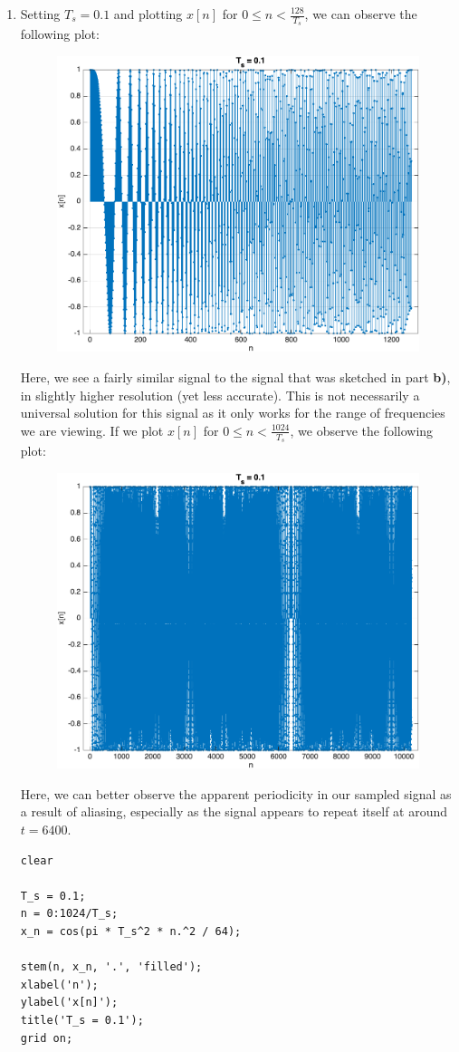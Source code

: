 \documentclass[12pt]{article}
\begin{document}
\begin{enumerate}[label=\textbf{\alph*)}, leftmargin=2.6em]
\item Setting $T_s=0.1$ and plotting $x[n]$ for $0\le n<\frac{128}{T_s}$, we can observe the following plot:
\begin{figure} [H]
    \centering
    \includegraphics[width=0.5\linewidth]{2d.png}
\end{figure}
Here, we see a fairly similar signal to the signal that was sketched in part \textbf{b)}, in slightly higher resolution (yet less accurate). This is not necessarily a universal solution for this signal as it only works for the range of frequencies we are viewing. If we plot $x[n]$ for $0\le n<\frac{1024}{T_s}$, we observe the following plot:
\begin{figure} [H]
    \centering
    \includegraphics[width=0.5\linewidth]{2e.png}
\end{figure}
Here, we can better observe the apparent periodicity in our sampled signal as a result of aliasing, especially as the signal appears to repeat itself at around $t=6400$.

\begin{verbatim}
clear

T_s = 0.1;
n = 0:1024/T_s;
x_n = cos(pi * T_s^2 * n.^2 / 64);

stem(n, x_n, '.', 'filled');
xlabel('n');
ylabel('x[n]');
title('T_s = 0.1');
grid on;
\end{verbatim}


\end{enumerate}
\end{document}
